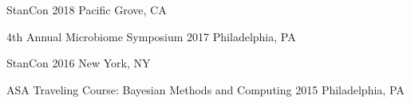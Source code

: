 

\begin{cvconfs}

  \cvconf
    {StanCon} %
    {2018} %
    {Pacific Grove, CA} %
    {}

  \cvconf
    {4th Annual Microbiome Symposium} %
    {2017} %
    {Philadelphia, PA} %
    {}
    
  \cvconf
    {StanCon} %
    {2016} %
    {New York, NY} %
    {}
    
  \cvconf
    {ASA Traveling Course: Bayesian Methods and Computing} %
    {2015} %
    {Philadelphia, PA} %
    {}
\end{cvconfs}

